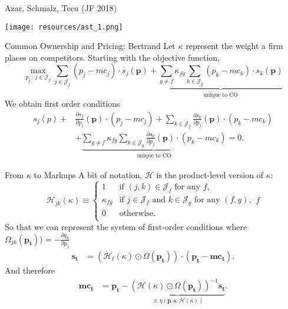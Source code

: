 \begin{frame}{Azar, Schmalz, Tecu (JF 2018)}

\begin{center}
\texttt{[image: resources/ast\_1.png]}
\end{center}
\end{frame}


\begin{frame}[plain]{Common Ownership and Pricing: Bertrand}
Let $\kappa$ represent the weight a firm places on competitors. Starting with the objective function,
 \begin{equation*}
 \max_{p_j \,:\, j \in \mathcal{J}_f} \sum_{j \in \mathcal{J}_f} (p_j - mc_j) \cdot s_j(\mathbf{p})+
 \underbrace{\sum_{g\neq f} \kappa_{fg} \sum_{k \in \mathcal{J}_g} (p_k - mc_k) \cdot s_k(\mathbf{p})}_{\text{unique to CO}}
 \end{equation*}
 \pause
We obtain first order conditions 
 \begin{align*}
 s_j(p) + &  \frac{\partial s_j}{\partial p_j}(\mathbf{p})  \cdot (p_j - mc_j)
 + \sum_{k \in \mathcal{J}_f} \frac{\partial s_k}{\partial p_j}(\mathbf{p})  \cdot (p_k - mc_k)\\
 & +\underbrace{\sum_{g\neq f} \kappa_{fg} \sum_{k \in \mathcal{J}_g} \frac{\partial s_k}{\partial p_j}(\mathbf{p})  \cdot (p_k - mc_k)}_{\text{unique to CO}}=0.
  \end{align*}
\end{frame}



\begin{frame}[plain,label=recoveringeta]{From $\kappa$ to Markups}
A bit of notation, $\mathcal{H}$ is the product-level version of $\kappa$:
 \begin{equation*}
 \mathcal{H}_{jk}(\kappa) \equiv
 \begin{cases}
 1 & \text{if $(j, k) \in \mathcal{J}_f$ for any $f$,} \\
 \kappa_{fg} &  \text{if $j \in \mathcal{J}_f$ and $k \in \mathcal{J}_g$  for any $(f,g)$},\\
 0 & \text{otherwise. } \\
 \end{cases}f
 \end{equation*}
So that we can represent the system of first-order conditions where $\Omega_{jk}(\mathbf{p_t})) = -\frac{\partial q_k}{\partial p_j}$
  \begin{align*}
 \mathbf{s_t} &= (\mathcal{H}_t(\kappa) \odot \Omega(\mathbf{p_t})) \cdot (\mathbf{p_t} - \mathbf{mc_t}).
 \end{align*}
And therefore
 \begin{align*}
  \mathbf{mc_t} &= \mathbf{p_t} - \underbrace{(\mathcal{H}(\kappa) \odot \Omega(\mathbf{p_t}))^{-1} \mathbf{s_t}}_{\equiv\eta(\mathbf{p},\mathbf{s},\mathcal{H}(\kappa))}.
 \end{align*}
 \end{frame}




